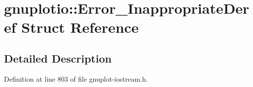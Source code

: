 \hypertarget{structgnuplotio_1_1_error___inappropriate_deref}{}\section{gnuplotio\+:\+:Error\+\_\+\+Inappropriate\+Deref Struct Reference}
\label{structgnuplotio_1_1_error___inappropriate_deref}


\subsection{Detailed Description}


Definition at line 803 of file gnuplot-\/iostream.\+h.

